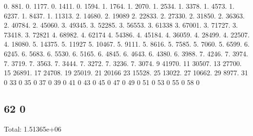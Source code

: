 0. 881. 0. 1177. 0. 1411. 0. 1594. 1. 1764. 1. 2070. 1. 2534. 1. 3378. 1. 4573. 1. 6237. 1. 8437. 1. 11313. 2. 14680. 2. 19089 2. 22833. 2. 27330. 2. 31850. 2. 36363. 2. 40784. 2. 45060. 3. 49345. 3. 52285. 3. 56553. 3. 61338 3. 67001. 3. 71727. 3. 73418. 3. 72821 4. 68982. 4. 62174 4. 54386. 4. 45184. 4. 36059. 4. 28499. 4. 22507. 4. 18080. 5. 14375. 5. 11927 5. 10467. 5. 9111. 5. 8616. 5. 7585. 5. 7060. 5. 6599. 6. 6245. 6. 5683. 6. 5530. 6. 5165. 6. 4845. 6. 4643. 6. 4380. 6. 3988. 7. 4246. 7. 3974. 7. 3719. 7. 3563. 7. 3444. 7. 3272. 7. 3236. 7. 3074. 9 41970. 11 30507. 13 27700. 15 26891. 17 24708. 19 25019. 21 20166 23 15528. 25 13022. 27 10662. 29 8977. 31 0 33 0 35 0 37 0 39 0 41 0 43 0 45 0 47 0 49 0 51 0 53 0 55 0 58 0 \subsection*{62 0 }

Total\+: 1.\+51365e+06 